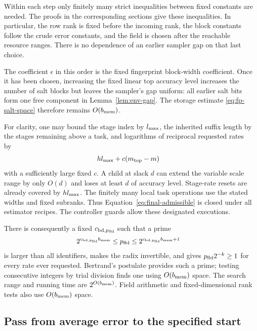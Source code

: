 \documentclass[11pt]{article}
\numberwithin{equation}{section}
\theoremstyle{definition}
\theoremstyle{remark}
\begin{document}
Within each step only finitely many strict inequalities between
fixed constants are needed. The proofs in the corresponding sections
give these inequalities. In particular, the row rank is fixed before
the incoming rank, the block constants follow the crude error
constants, and the field is chosen after the reachable resource
ranges. There is no dependence of an earlier sampler gap on that
last choice.

The coefficient $\epsilon$ in this order is the fixed fingerprint
block-width coefficient. Once it has been chosen, increasing the fixed
linear top accuracy level increases the number of salt blocks but leaves the
sampler's gap uniform: all earlier salt bits form one free component in
Lemma~\ref{lem:env-gap}. The storage estimate
\eqref{eq:fp-salt-space} therefore remains $O({b_{\rm mem}})$.

For clarity, one may bound the stage index by ${l_{\rm max}}$, the inherited
suffix length by the stages remaining above a task, and logarithms
of reciprocal requested rates by
\begin{equation}\label{eq:final-admissible}
{h}{l_{\rm max}}+c({m}_{\mathrm{top}}-{m})
\end{equation}
with a sufficiently large fixed $c$. A child at slack $d$ can extend
the variable scale range by only $O(d)$ and loses at least $d$ of
accuracy level. Stage-rate resets are already covered by ${h}{l_{\rm max}}$.
The finitely many local task operations use the stated widths and
fixed subranks. Thus Equation~\eqref{eq:final-admissible} is closed
under all estimator recipes. The controller guards allow these
designated executions.

There is consequently a fixed ${c_{\mathrm{bd},p_{\rm fld}}}$ such that a prime
\[
2^{{c_{\mathrm{bd},p_{\rm fld}}}{b_{\rm mem}}}\le {p_{\rm fld}}\le 2^{{c_{\mathrm{bd},p_{\rm fld}}}{b_{\rm mem}}+1}
\]
is larger than all identifiers, makes the radix invertible, and gives
${p_{\rm fld}}2^{-k}\ge1$ for every rate ever requested. Bertrand's postulate
provides such a prime; testing consecutive integers by trial division
finds one using $O({b_{\rm mem}})$ space. The search range and running time are
$2^{O({b_{\rm mem}})}$. Field arithmetic and fixed-dimensional rank tests also
use $O({b_{\rm mem}})$ space.

\subsection{Pass from average error to the specified start}
\end{document}
